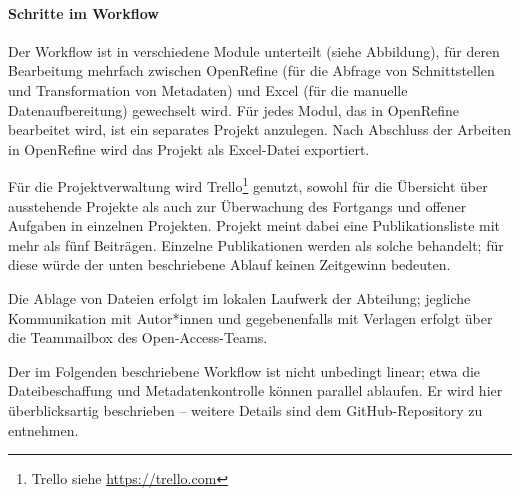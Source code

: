 \documentclass[a4paper,
fontsize=11pt,
oneside,
numbers=noperiodatend,
parskip=half-,
bibliography=totoc,
final
]{scrartcl}
\begin{document}
\hypertarget{schritte-im-workflow}{%
\paragraph{Schritte im Workflow}\label{schritte-im-workflow}}

Der Workflow ist in verschiedene Module unterteilt (siehe Abbildung),
für deren Bearbeitung mehrfach zwischen OpenRefine (für die Abfrage von
Schnittstellen und Transformation von Metadaten) und Excel (für die
manuelle Datenaufbereitung) gewechselt wird. Für jedes Modul, das in
OpenRefine bearbeitet wird, ist ein separates Projekt anzulegen. Nach
Abschluss der Arbeiten in OpenRefine wird das Projekt als Excel-Datei
exportiert.

Für die Projektverwaltung wird Trello\footnote{Trello siehe
  \url{https://trello.com}} genutzt, sowohl für die Übersicht über
ausstehende Projekte als auch zur Überwachung des Fortgangs und offener
Aufgaben in einzelnen Projekten. Projekt meint dabei eine
Publikationsliste mit mehr als fünf Beiträgen. Einzelne Publikationen
werden als solche behandelt; für diese würde der unten beschriebene
Ablauf keinen Zeitgewinn bedeuten.

Die Ablage von Dateien erfolgt im lokalen Laufwerk der Abteilung;
jegliche Kommunikation mit Autor*innen und gegebenenfalls mit Verlagen
erfolgt über die Teammailbox des Open-Access-Teams.

Der im Folgenden beschriebene Workflow ist nicht unbedingt linear; etwa
die Dateibeschaffung und Metadatenkontrolle können parallel ablaufen. Er
wird hier überblicksartig beschrieben -- weitere Details sind dem
GitHub-Repository zu entnehmen.
\end{document}
